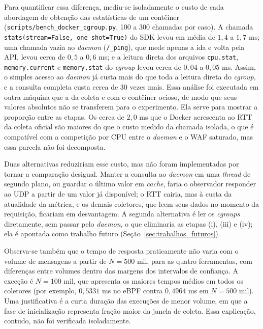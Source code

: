 Para quantificar essa diferença, mediu-se isoladamente o custo de cada abordagem de obtenção das estatísticas de um contêiner (\texttt{scripts/bench\_docker\_cgroup.py}, 100 a 300 chamadas por caso). A chamada \texttt{stats(stream=False, one\_shot=True)} do SDK levou em média de $1{,}4$ a $1{,}7$ ms; uma chamada vazia ao \textit{daemon} (\texttt{/\_ping}), que mede apenas a ida e volta pela API, levou cerca de $0{,}5$ a $0{,}6$ ms; e a leitura direta dos arquivos \texttt{cpu.stat}, \texttt{memory.current} e \texttt{memory.stat} do \textit{cgroup} levou cerca de $0{,}04$ a $0{,}05$ ms. Assim, o simples acesso ao \textit{daemon} já custa mais do que toda a leitura direta do \textit{cgroup}, e a consulta completa custa cerca de 30 vezes mais. Essa análise foi executada em outra máquina que a da coleta e com o contêiner ocioso, de modo que seus valores absolutos não se transferem para o experimento. Ela serve para mostrar a proporção entre as etapas. Os cerca de $2{,}0$ ms que o Docker acrescenta ao RTT da coleta oficial são maiores do que o custo medido da chamada isolada, o que é compatível com a competição por CPU entre o \textit{daemon} e o WAF saturado, mas essa parcela não foi decomposta.

Duas alternativas reduziriam esse custo, mas não foram implementadas por tornar a comparação desigual. Manter a consulta ao \textit{daemon} em uma \textit{thread} de segundo plano, ou guardar o último valor em \textit{cache}, faria o observador responder ao UDP a partir de um valor já disponível; o RTT cairia, mas à custa da atualidade da métrica, e os demais coletores, que leem seus dados no momento da requisição, ficariam em desvantagem. A segunda alternativa é ler os \textit{cgroups} diretamente, sem passar pelo \textit{daemon}, o que eliminaria as etapas (i), (iii) e (iv); ela é apontada como trabalho futuro (Seção~\ref{sec:trabalhos_futuros}).

Observa-se também que o tempo de resposta praticamente não varia com o volume de mensagens a partir de $N = 500$ mil, para as quatro ferramentas, com diferenças entre volumes dentro das margens dos intervalos de confiança. A exceção é $N = 100$ mil, que apresenta os maiores tempos médios em todos os coletores (por exemplo, $0{,}5331$ ms no eBPF contra $0{,}4964$ ms em $N = 500$ mil). Uma justificativa é a curta duração das execuções de menor volume, em que a fase de inicialização representa fração maior da janela de coleta. Essa explicação, contudo, não foi verificada isoladamente.

